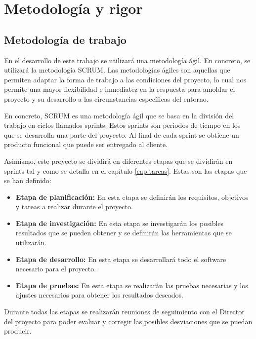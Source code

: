 \chapter{Metodología y rigor}
\label{cap:metodologia}

\section{Metodología de trabajo}
\label{sec:metodologia:metodologia_trabajo}


En el desarrollo de este trabajo se utilizará una metodología ágil. En concreto, se utilizará 
la metodología SCRUM. Las metodologías ágiles son aquellas que permiten adaptar la forma de
trabajo a las condiciones del proyecto, lo cual nos permite una mayor flexibilidad e 
inmediatez en la respuesta para amoldar el proyecto y su desarrollo a las circunstancias
específicas del entorno.

En concreto, SCRUM es una metodología ágil que se basa en la división del trabajo en ciclos
llamados sprints. Estos sprints son periodos de tiempo en los que se desarrolla una parte
del proyecto. Al final de cada sprint se obtiene un producto funcional que puede ser entregado
al cliente. \cite{MetodoAgile}

Asimismo, este proyecto se dividirá en diferentes etapas que se dividirán en sprints tal y
como se detalla en el capítulo \ref{cap:tareas}. Estas son las etapas que se han definido:

\begin{itemize}
    \item \textbf{Etapa de planificación:} En esta etapa se definirán los requisitos, 
    objetivos y tareas a realizar durante el proyecto.
    \item \textbf{Etapa de investigación:} En esta etapa se investigarán los posibles 
    resultados que se pueden obtener y se definirán las herramientas que se utilizarán.
    \item \textbf{Etapa de desarrollo:} En esta etapa se desarrollará todo el software 
    necesario para el proyecto.
    \item \textbf{Etapa de pruebas:} En esta etapa se realizarán las pruebas necesarias y los 
    ajustes necesarios para obtener los resultados deseados.
\end{itemize}

Durante todas las etapas se realizarán reuniones de seguimiento con el Director del proyecto para
poder evaluar y corregir las posibles desviaciones que se puedan producir.

